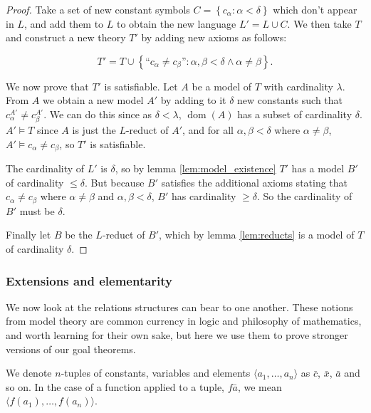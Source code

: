 \documentclass[10pt, a4paper, oneside]{article}
\theoremstyle{definition}
\theoremstyle{remark}
\theoremstyle{plain}
\theoremstyle{plain}
\DeclareMathOperator{\dom}{dom}
\begin{document}
\begin{proof}
    Take a set of new constant symbols $C = \left\{ c_\alpha : \alpha < \delta
    \right\}$ which don't appear in $L$, and add them to $L$ to obtain the new
    language $L' = L \cup C$. We then take $T$ and construct a new theory $T'$
    by adding new axioms as follows:
    
    \begin{equation}
        T' = T \cup \left\{
            \text{``$c_\alpha \neq c_\beta$''}
            :
            \alpha, \beta < \delta \wedge \alpha \neq \beta
        \right\}.
    \end{equation}
    
    We now prove that $T'$ is satisfiable. Let $A$ be a model of $T$ with
    cardinality $\lambda$. From $A$ we obtain a new model $A'$ by adding to it
    $\delta$ new constants such that $c_\alpha^{A'} \neq c_\beta^{A'}$. We can
    do this since as $\delta < \lambda$, $\dom(A)$ has a subset of cardinality
    $\delta$. $A' \models T$ since $A$ is just the $L$-reduct of $A'$, and for
    all $\alpha, \beta < \delta$ where $\alpha \neq \beta$,
    $A' \models c_\alpha \neq c_\beta$, so $T'$ is satisfiable.
    
    The cardinality of $L'$ is $\delta$, so by lemma \ref{lem:model_existence}
    $T'$ has a model $B'$ of cardinality $\leq \delta$. But because $B'$
    satisfies the additional axioms stating that $c_\alpha \neq c_\beta$ where
    $\alpha \neq \beta$ and $\alpha, \beta < \delta$, $B'$ has cardinality
    $\geq \delta$. So the cardinality of $B'$ must be $\delta$.
    
    Finally let $B$ be the $L$-reduct of $B'$, which by lemma \ref{lem:reducts}
    is a model of $T$ of cardinality $\delta$.
\end{proof}

\subsubsection{Extensions and elementarity}

We now look at the relations structures can bear to one another. These notions
from model theory are common currency in logic and philosophy of mathematics,
and worth learning for their own sake, but here we use them to prove stronger
versions of our goal theorems.

We denote $n$-tuples of constants, variables and elements $\langle a_1, \dotsc,
a_n \rangle$ as $\bar{c}$, $\bar{x}$, $\bar{a}$ and so on. In the case of a
function applied to a tuple, $f\bar{a}$, we mean $\langle f(a_1), \dotsc, f(a_n)
\rangle$.
\end{document}
